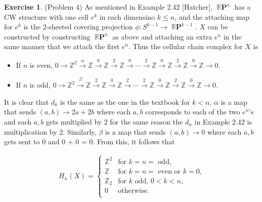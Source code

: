 \documentclass[12pt, psamsfonts]{amsart}
\theoremstyle{definition}
\newtheorem*{exer}{Exercise}
\theoremstyle{remark}
\DeclareMathOperator{\RP}{\mathbb{R}\mathbf{P}}
\numberwithin{equation}{section}
\begin{document}
\begin{exer}{(Problem 4)}
  As mentioned in Example 2.42 [Hatcher], $\RP^n$ has a CW structure with one cell $e^k$ in each dimensino $k \leq n$, and the attaching map for $e^k$ is the 2-sheeted covering projection $\phi: S^{k - 1} \rightarrow \RP^{k - 1}$.
  $X$ can be constructed by constructing $\RP^n$ as above and attaching an extra $e^n$ in the same manner that we attach the first $e^n$.
  Thus the cellular chain complex for $X$ is
  \begin{itemize}
    \item
      If $n$ is even, $0 \rightarrow \mathbb{Z}^2 \xrightarrow{\alpha} \mathbb{Z} \xrightarrow{0} \mathbb{Z} \xrightarrow{2} \mathbb{Z} \xrightarrow{0} \cdots \xrightarrow{2} \mathbb{Z} \xrightarrow{0} \mathbb{Z} \xrightarrow{2} \mathbb{Z} \xrightarrow{0} \mathbb{Z} \rightarrow 0$.
    \item
      If $n$ is odd, $0 \rightarrow \mathbb{Z}^2 \xrightarrow{\beta} \mathbb{Z} \xrightarrow{2} \mathbb{Z} \xrightarrow{0} \mathbb{Z} \xrightarrow{2} \cdots \xrightarrow{2} \mathbb{Z} \xrightarrow{0} \mathbb{Z} \xrightarrow{2} \mathbb{Z} \xrightarrow{0} \mathbb{Z} \rightarrow 0$.
  \end{itemize}
  It is clear that $d_k$ is the same as the one in the textbook for $k < n$.
  $\alpha$ is a map that sends $(a, b) \rightarrow 2a + 2b$ where each $a, b$ corresponds to each of the two $e^n$'s and each $a, b$ gets multiplied by 2 for the same reason the $d_n$ in Example 2.42 is multiplication by 2.
  Similarly, $\beta$ is a map that sends $(a, b) \rightarrow 0$ where each $a, b$ gets sent to 0 and 0 + 0 = 0.
  From this, it follows that

  \begin{align*}
    H_{n}(X) = \begin{cases}
      \mathbb{Z}^2 & \text{for $k = n =$ odd,} \\
      \mathbb{Z} & \text{for $k = n =$ even or $k = 0$,} \\
      \mathbb{Z}_2 & \text{for $k$ odd, $0 < k < n$,} \\
      0 & \text{otherwise.} \\
    \end{cases}
  \end{align*}
\end{exer}
\end{document}
